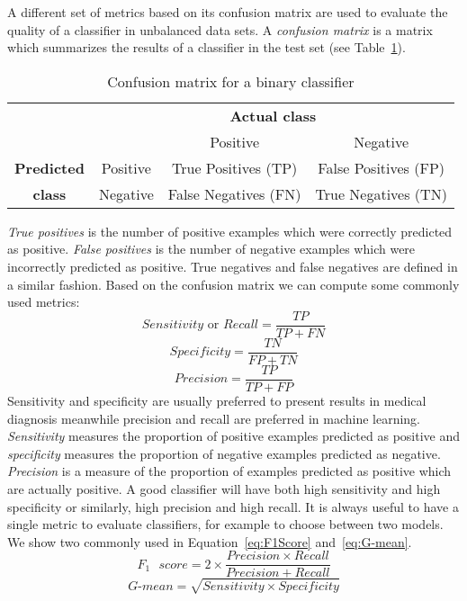 A different set of metrics based on its confusion matrix are used to evaluate the quality of a classifier in unbalanced data sets. A \emph{confusion matrix} is a matrix which summarizes the results of a classifier in the test set (see Table~\ref{tab:ConfusionMatrix}).
\begin{table}[h]
	\centering
	\begin{tabular}{cc|c|c|}
		&\multicolumn{3}{c}{\textbf{Actual class}}\\
		&&Positive & Negative \\
		\cline{2-4}
		\textbf{Predicted}&Positive&True Positives (TP)& False Positives (FP)\\
		\cline{2-4}
		\textbf{class}&Negative&False Negatives (FN) & True Negatives (TN)\\
		\cline{2-4}
	\end{tabular}
	\caption{Confusion matrix for a binary classifier}
	\label{tab:ConfusionMatrix}
\end{table}
\emph{True positives} is the number of positive examples which were correctly predicted as positive. \emph{False positives} is the number of negative examples which were incorrectly predicted as positive. True negatives and false negatives are defined in a similar fashion. Based on the confusion matrix we can compute some commonly used metrics:
\begin{equation}
	Sensitivity \text{ or } Recall = \frac{TP}{TP+FN}
\end{equation}
\begin{equation}
	Specificity = \frac{TN}{FP+TN}
\end{equation}
\begin{equation}
	Precision = \frac{TP}{TP+FP}
\end{equation}
Sensitivity and specificity are usually preferred to present results in medical diagnosis meanwhile precision and recall are preferred in machine learning. \emph{Sensitivity} measures the proportion of positive examples predicted as positive and \emph{specificity} measures the proportion of negative examples predicted as negative. \emph{Precision} is a measure of the proportion of examples predicted as positive which are actually positive. A good classifier will have both high sensitivity and high specificity or similarly, high precision and high recall. It is always useful to have a single metric to evaluate classifiers, for example to choose between two models. We show two commonly used in Equation~\ref{eq:F1Score} and~\ref{eq:G-mean}.
\begin{equation}
	F_1\text{ }score = 2\times\frac{Precision \times Recall}{Precision + Recall}
	\label{eq:F1Score}
\end{equation}
\begin{equation}
	G\text{-}mean = \sqrt{Sensitivity \times Specificity}
	\label{eq:G-mean}
\end{equation}

